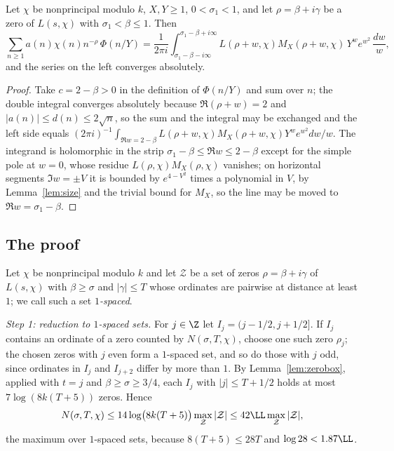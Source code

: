 \begin{lemma}\label{lem:detector}
Let $\chi$ be nonprincipal modulo $k$, $X,Y\ge1$, $0<\sigma_1<1$, and let $\rho=\beta+i\gamma$ be a zero of $L(s,\chi)$ with $\sigma_1<\beta\le1$. Then
\[
  \sum_{n\ge1}a(n)\chi(n)n^{-\rho}\,\Phi(n/Y)=\frac1{2\pi i}\int_{\sigma_1-\beta-i\infty}^{\sigma_1-\beta+i\infty}L(\rho+w,\chi)M_X(\rho+w,\chi)\,Y^we^{w^2}\,\frac{dw}w ,
\]
and the series on the left converges absolutely.
\end{lemma}

\begin{proof}
Take $c=2-\beta>0$ in the definition of $\Phi(n/Y)$ and sum over $n$; the double integral converges absolutely because $\Re(\rho+w)=2$ and $|a(n)|\le d(n)\le2\sqrt n$, so the sum and the integral may be exchanged and the left side equals $(2\pi i)^{-1}\int_{\Re w=2-\beta}L(\rho+w,\chi)M_X(\rho+w,\chi)Y^we^{w^2}dw/w$. The integrand is holomorphic in the strip $\sigma_1-\beta\le\Re w\le2-\beta$ except for the simple pole at $w=0$, whose residue $L(\rho,\chi)M_X(\rho,\chi)$ vanishes; on horizontal segments $\Im w=\pm V$ it is bounded by $e^{4-V^2}$ times a polynomial in $V$, by Lemma~\ref{lem:size} and the trivial bound for $M_X$, so the line may be moved to $\Re w=\sigma_1-\beta$.
\end{proof}

\subsection{The proof}

Let $\chi$ be nonprincipal modulo $k$ and let $\mathcal Z$ be a set of zeros $\rho=\beta+i\gamma$ of $L(s,\chi)$ with $\beta\ge\sigma$ and $|\gamma|\le T$ whose ordinates are pairwise at distance at least $1$; we call such a set \emph{$1$-spaced}.

\emph{Step 1: reduction to $1$-spaced sets.} For $j\in\Z$ let $I_j=(j-1/2,j+1/2]$. If $I_j$ contains an ordinate of a zero counted by $N(\sigma,T,\chi)$, choose one such zero $\rho_j$; the chosen zeros with $j$ even form a $1$-spaced set, and so do those with $j$ odd, since ordinates in $I_j$ and $I_{j+2}$ differ by more than $1$. By Lemma~\ref{lem:zerobox}, applied with $t=j$ and $\beta\ge\sigma\ge3/4$, each $I_j$ with $|j|\le T+1/2$ holds at most $7\log(8k(T+5))$ zeros. Hence
\begin{equation}\label{eq:spaced}
  N(\sigma,T,\chi)\le14\log\bigl(8k(T+5)\bigr)\max_{\mathcal Z}|\mathcal Z|\le42\LL\max_{\mathcal Z}|\mathcal Z|,
\end{equation}
the maximum over $1$-spaced sets, because $8(T+5)\le28T$ and $\log28<1.87\LL$.

